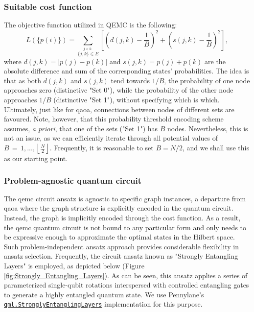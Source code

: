\subsubsection*{\small Suitable cost function}
The objective function utilized in QEMC is the following:
\begin{equation}
L(\{p(i)\}) = \sum_{\stackrel{j < k:}{\{j,k\}\in E}}\left[\left(d(j,k)-\frac{1}{B}\right)^{2}+\left(s(j,k)-\frac{1}{B}\right)^{2}\right],
\end{equation}
where $d(j,k) = |p(j) - p(k)|$ and $s(j, k) = p(j) + p(k)$ are the absolute difference and sum of the corresponding states' probabilities. The idea is that as both $d(j, k)$ and $s(j, k)$ tend towards $1/B$, the probability of one node approaches zero (distinctive "Set 0"), while the probability of the other node approaches $1/B$ (distinctive "Set 1"), without specifying which is which. Ultimately, just like for \acrshort{qaoa}, connections between nodes of different sets are favoured. Note, however, that this probability threshold encoding scheme assumes, \textit{a priori}, that one of the sets ("Set 1") has $B$ nodes. Nevertheless, this is not an issue, as we can efficiently iterate through all potential values of $B\,=\,1,...,\left\lfloor{\frac{N}{2}}\right\rfloor$. Frequently, it is reasonable to set $B = N/2$, and we shall use this as our starting point.

\subsubsection*{\small Problem-agnostic quantum circuit}
The \acrshort{qemc} circuit ansatz is agnostic to specific graph instances, a departure from \acrshort{qaoa} where the graph structure is explicitly encoded in the quantum circuit. Instead, the graph is implicitly encoded through the cost function. As a result, the \acrshort{qemc} quantum circuit is not bound to any particular form and only needs to be expressive enough to approximate the optimal states in the Hilbert space. Such problem-independent ansatz approach provides considerable flexibility in ansatz selection. Frequently, the circuit ansatz known as "Strongly Entangling Layers" is employed, as depicted below (Figure \ref{fig:Strongly_Entangling_Layers}). As can be seen, this ansatz applies a series of parameterized single-qubit rotations interspersed with controlled entangling gates to generate a highly entangled quantum state. We use Pennylane's \href{https://docs.pennylane.ai/en/stable/code/api/pennylane.StronglyEntanglingLayers.html}{\texttt{qml.StronglyEntanglingLayers}} implementation for this purpose.

